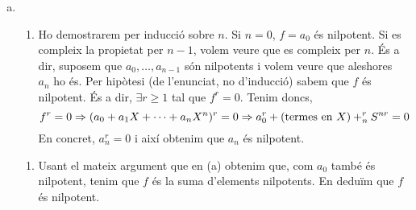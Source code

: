 \documentclass[../main.tex]{subfiles}
\begin{document}
\begin{sol}
\begin{enumerate}[(a)]
    
    \item \begin{enumerate}[($\Rightarrow$)]
        \item Ho demostrarem per inducció sobre $n$. Si $n = 0$, $f = a_0$ és nilpotent. Si es compleix la propietat per $n-1$, volem veure que es compleix per $n$. És a dir, suposem que $a_0,\ldots,a_{n-1}$ són nilpotents i volem veure que aleshores $a_n$ ho és. Per hipòtesi (de l'enunciat, no d'inducció) sabem que $f$ és nilpotent. És a dir, $\exists r\geq 1$ tal que $f^r = 0$. Tenim doncs,
        \begin{equation}
            \notag
            f^r = 0\Rightarrow (a_0+a_1X+\cdots+a_nX^n)^r = 0 \Rightarrow a_0^r+(\text{termes en $X$})+_n^rS^{nr} = 0
        \end{equation}
        En concret, $a_n^r = 0$ i així obtenim que $a_n$ és nilpotent.
    \end{enumerate}
    \begin{enumerate}[($\Leftarrow$)]
        \item Usant el mateix argument que en (a) obtenim que, com $a_0$ també és nilpotent, tenim que $f$ és la suma d'elements nilpotents. En deduïm que $f$ és nilpotent.
    \end{enumerate}
    

\end{enumerate}
\end{sol}
\end{document}
